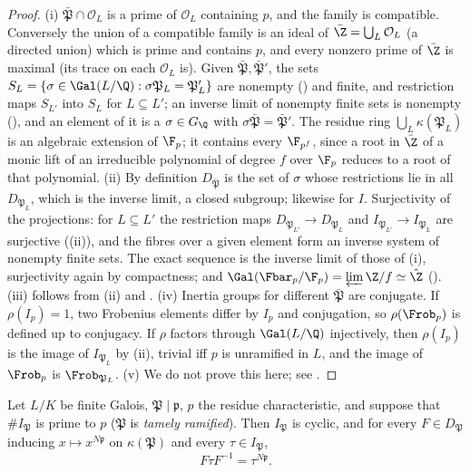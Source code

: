 \begin{proof}
(i) $\bar{\mathfrak P}\cap\mathcal O_L$ is a prime of $\mathcal O_L$ containing $p$, and the family is compatible. Conversely the union of a compatible family is
an ideal of $\bar\Z=\bigcup_L\mathcal O_L$ (a directed union) which is prime and contains $p$, and every nonzero prime of $\bar\Z$ is maximal (its trace on
each $\mathcal O_L$ is). Given $\bar{\mathfrak P},\bar{\mathfrak P}'$, the sets $S_L=\{\sigma\in\Gal(L/\Q):\sigma\mathfrak P_L=\mathfrak P'_L\}$ are nonempty
() and finite, and restriction maps $S_{L'}$ into $S_L$ for $L\subseteq L'$; an inverse limit of nonempty finite sets is
nonempty (), and an element of it is a $\sigma\in G_\Q$ with $\sigma\bar{\mathfrak P}=\bar{\mathfrak P}'$. The residue ring $\bigcup_L\kappa(\mathfrak P_L)$
is an algebraic extension of $\F_p$; it contains every $\F_{p^f}$, since a root in $\bar\Z$ of a monic lift of an irreducible polynomial of degree $f$
over $\F_p$ reduces to a root of that polynomial. (ii) By definition $D_{\bar{\mathfrak P}}$ is the set of $\sigma$ whose restrictions lie in all
$D_{\mathfrak P_L}$, which is the inverse limit, a closed subgroup; likewise for $I$. Surjectivity of the projections: for $L\subseteq L'$ the restriction
maps $D_{\mathfrak P_{L'}}\to D_{\mathfrak P_L}$ and $I_{\mathfrak P_{L'}}\to I_{\mathfrak P_L}$ are surjective ((ii)), and the
fibres over a given element form an inverse system of nonempty finite sets. The exact sequence is the inverse limit of those of
(i), surjectivity again by compactness; and $\Gal(\Fbar_p/\F_p)=\varprojlim\Z/f\simeq\hat\Z$ ().
(iii) follows from (ii) and . (iv) Inertia groups for different $\bar{\mathfrak P}$ are conjugate. If $\rho(I_p)=1$, two Frobenius
elements differ by $I_p$ and conjugation, so $\rho(\Frob_p)$ is defined up to conjugacy. If $\rho$ factors through $\Gal(L/\Q)$ injectively, then
$\rho(I_p)$ is the image of $I_{\mathfrak P_L}$ by (ii), trivial iff $p$ is unramified in $L$, and the image of $\Frob_p$ is $\Frob_{\mathfrak P_L}$.
(v) We do not prove this here; see .
\end{proof}

\begin{proposition}\label{prop:ant:tameconj}
Let $L/K$ be finite Galois, $\mathfrak P\mid\mathfrak p$, $p$ the residue characteristic, and suppose that $\#I_{\mathfrak P}$ is prime to $p$ ($\mathfrak P$ is
\emph{tamely ramified}). Then $I_{\mathfrak P}$ is cyclic, and for every $F\in D_{\mathfrak P}$ inducing $x\mapsto x^{N\mathfrak p}$ on $\kappa(\mathfrak P)$ and every
$\tau\in I_{\mathfrak P}$,
\[
F\tau F^{-1}=\tau^{N\mathfrak p}.
\]
\end{proposition}

